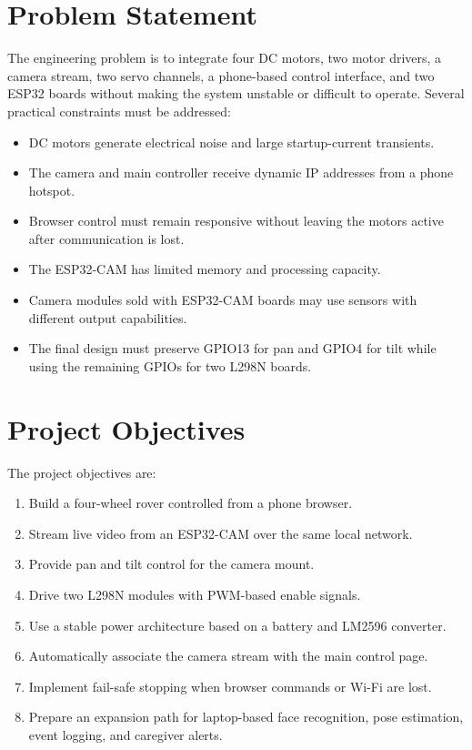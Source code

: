 \documentclass[12pt,a4paper,oneside]{report}
\begin{document}
\section{Problem Statement}
The engineering problem is to integrate four DC motors, two motor drivers, a
camera stream, two servo channels, a phone-based control interface, and two
ESP32 boards without making the system unstable or difficult to operate.
Several practical constraints must be addressed:

\begin{itemize}
  \item DC motors generate electrical noise and large startup-current transients.
  \item The camera and main controller receive dynamic IP addresses from a phone
        hotspot.
  \item Browser control must remain responsive without leaving the motors active
        after communication is lost.
  \item The ESP32-CAM has limited memory and processing capacity.
  \item Camera modules sold with ESP32-CAM boards may use sensors with different
        output capabilities.
  \item The final design must preserve GPIO13 for pan and GPIO4 for tilt while
        using the remaining GPIOs for two L298N boards.
\end{itemize}

\section{Project Objectives}
The project objectives are:

\begin{enumerate}
  \item Build a four-wheel rover controlled from a phone browser.
  \item Stream live video from an ESP32-CAM over the same local network.
  \item Provide pan and tilt control for the camera mount.
  \item Drive two L298N modules with PWM-based enable signals.
  \item Use a stable power architecture based on a battery and LM2596 converter.
  \item Automatically associate the camera stream with the main control page.
  \item Implement fail-safe stopping when browser commands or Wi-Fi are lost.
  \item Prepare an expansion path for laptop-based face recognition, pose
        estimation, event logging, and caregiver alerts.
\end{enumerate}
\end{document}
